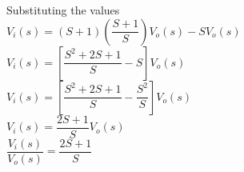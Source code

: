 \documentclass[11pt,letterpaper]{article}
\begin{document}
\begin{minipage}{.5\textwidth}
Substituting the values\\	

	$V_i(s)=(S+1)\left(\dfrac{S+1}{S}\right)V_o(s)-SV_o(s)$\\

	$V_i(s)=\left[\dfrac{S^2+2S+1}{S}-S\right]V_o(s)$\\

	$V_i(s)=\left[\dfrac{S^2+2S+1}{S}-\dfrac{S^2}{S}\right]V_o(s)$\\

	$V_i(s)=\dfrac{2S+1}{S}V_o(s)$\\

	$\dfrac{V_i(s)}{V_o(s)}=\dfrac{2S+1}{S}$\\

	\\
	
	\end{minipage}
\end{document}
